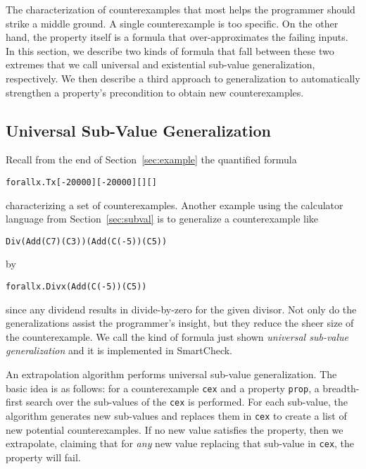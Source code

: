 \documentclass{sigplanconf}
\newenvironment{code}{\begin{alltt}\footnotesize}{\end{alltt}}
\newcommand{\ttp}[1]{\texttt{#1}}
\begin{document}
The characterization of counterexamples that most helps the programmer should
strike a middle ground.  A single counterexample is too specific.  On the other
hand, the property itself is a formula that over-approximates the failing
inputs.  In this section, we describe two kinds of formula that fall between
these two extremes that we call universal and existential sub-value
generalization, respectively.  We then describe a third approach to
generalization to automatically strengthen a property's precondition to obtain
new counterexamples.

\subsection{Universal Sub-Value Generalization}\label{sec:universal}
Recall from the end of Section~\ref{sec:example} the quantified formula
%
\begin{code}
forall x . T x [-20000] [-20000] [] []
\end{code}
%
\noindent
characterizing a set of counterexamples.  Another example using the calculator
language from Section~\ref{sec:subval} is to generalize a counterexample like
%
\begin{code}
Div (Add (C 7) (C 3)) (Add (C (-5)) (C 5))
\end{code}
%
\noindent
by
%
\begin{code}
forall x . Div x (Add (C (-5)) (C 5))
\end{code}
%
\noindent
since any dividend results in divide-by-zero for the given divisor.  Not only do
the generalizations assist the programmer's insight, but they reduce the sheer
size of the counterexample.  We call the kind of formula just shown
\emph{universal sub-value generalization} and it is implemented in SmartCheck.

An extrapolation algorithm performs universal sub-value generalization.  The
basic idea is as follows: for a counterexample \ttp{cex} and a property
\ttp{prop}, a breadth-first search over the sub-values of the \ttp{cex} is
performed.  For each sub-value, the algorithm generates new sub-values and
replaces them in \ttp{cex} to create a list of new potential counterexamples.
If no new value satisfies the property, then we extrapolate, claiming that for
\emph{any} new value replacing that sub-value in \ttp{cex}, the property will
fail.
\end{document}
